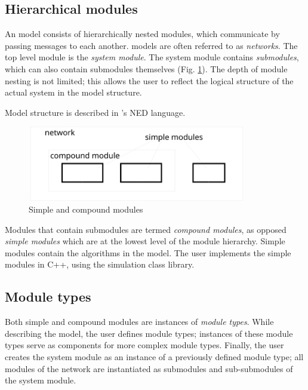 \subsection{Hierarchical modules}


An {\opp} model consists of hierarchically nested
modules, which communicate by passing
messages to each another.
{\opp} models are often referred to as \textit{networks}. The top
level module is the \textit{system module}.  The system module
contains \textit{submodules}, which can also contain submodules
themselves (Fig. \ref{fig:ch-overview:modules}). The depth of module
nesting is not limited; this allows the user to reflect the logical
structure of the actual system in the model structure.

Model structure is described in {\opp}'s NED language.

\begin{figure}[htbp]
\begin{center}
\includegraphics[width=3.772in, height=1.292in]{figures/modules}
\caption{Simple and compound modules}
\label{fig:ch-overview:modules}
\end{center}
\end{figure}


Modules that contain submodules are termed \textit{compound
  modules}, as opposed \textit{simple
  modules} which are at the lowest level of the
module hierarchy. Simple modules contain the algorithms in the model.
The user implements the simple modules in C++, using the {\opp}
simulation class library.


\subsection{Module types}

Both simple and compound modules are instances of \textit{module
  types}. While describing the model, the user defines module types;
instances of these module types serve as components for more complex
module types. Finally, the user creates the system module as an
instance of a previously defined module type; all modules of the
network are instantiated as submodules and sub-submodules of the
system module.

